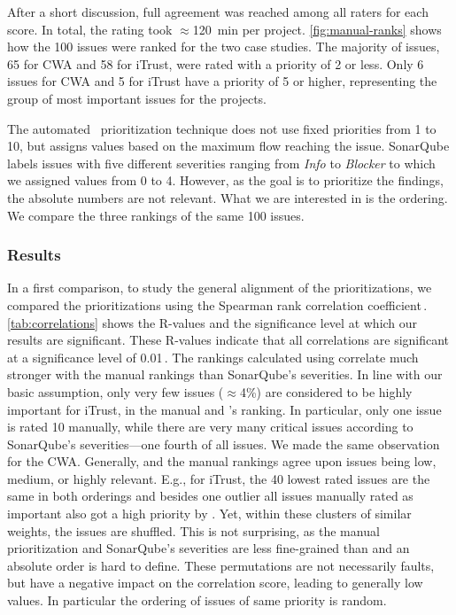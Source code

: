After a short discussion, full agreement was reached among all raters for each score.
In total, the rating took $\approx$120~min per project.
\autoref{fig:manual-ranks} shows how the 100 issues were ranked for the two case studies.
The majority of issues, 65 for CWA and 58 for iTrust, were rated with a priority of 2 or less. Only 6 issues for CWA and 5 for iTrust have a priority of 5 or higher, representing the group of most important issues for the projects.


The automated \appr\ prioritization technique does not use fixed priorities from 1 to 10, but assigns values based on the maximum flow reaching the issue.
SonarQube labels issues with five different severities ranging from \textit{Info} to \textit{Blocker} to which we assigned values from 0 to 4.
However, as the goal is to prioritize the findings, the absolute numbers are not relevant.
What we are interested in is the ordering. We compare the three rankings of the same 100 issues.

\subsubsection{Results}
%
In a first comparison, to study the general alignment of the prioritizations, we compared the prioritizations using the Spearman rank correlation coefficient\,\cite{10.2307/1412159}.
\autoref{tab:correlations} shows the %
R-values and the significance level at which our results are significant.
These R-values indicate that all correlations are significant at a significance level of 0.01\,\cite{Whitlock2008ABD}.
The rankings calculated using \appr{} correlate much stronger with the manual rankings than SonarQube's severities.
In line with our basic assumption,  only very few issues ($\approx$4\%) are considered to be highly important for iTrust, in the manual and \appr 's ranking. In particular, only one issue is rated 10 manually, while there are very many critical issues according to SonarQube's severities---one fourth of all issues.
We made the same observation for the CWA.
Generally, \appr{} and the manual rankings agree upon issues being low, medium, or highly relevant.
E.g., for iTrust, the 40 lowest rated issues are the same in both orderings and besides one outlier all issues manually rated as important also got a high priority by \appr.
Yet, within these clusters of similar weights, the issues are shuffled. %
This is not surprising, as the manual prioritization and SonarQube's severities are less fine-grained than \appr{} and an absolute order is hard to define.
These permutations are not necessarily faults, but have a negative impact on the correlation score, leading to generally low values.
In particular the ordering of issues of same priority is random.


